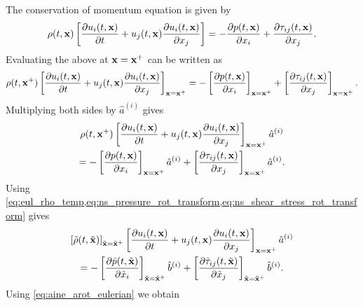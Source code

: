 \documentclass[oneside,a4paper,11pt]{report}
\begin{document}
The conservation of momentum equation is given by
\begin{equation}
    \rho(t,\mathbf{x}) \left [\frac{\partial u_i(t,\mathbf{x})}{\partial t} + u_j(t,\mathbf{x}) \frac{\partial u_i(t,\mathbf{x})}{\partial x_j} \right ] = -\frac{\partial p(t,\mathbf{x})}{\partial x_i} + \frac{\partial \tau_{ij}(t,\mathbf{x})}{\partial x_j}.
\end{equation}
Evaluating the above at $\mathbf{x} = \mathbf{x}^+$ can be written as
\begin{equation}
    \rho(t,\mathbf{x}^+) \left [\frac{\partial u_i(t,\mathbf{x})}{\partial t} + u_j(t,\mathbf{x}) \frac{\partial u_i(t,\mathbf{x})}{\partial x_j} \right ]_{\mathbf{x} = \mathbf{x}^+} = -\left [ \frac{\partial p(t,\mathbf{x})}{\partial x_i} \right]_{\mathbf{x} = \mathbf{x}^+} + \left [ \frac{\partial \tau_{ij}(t,\mathbf{x})}{\partial x_j} \right ]_{\mathbf{x} = \mathbf{x}^+}.
\end{equation}
Multiplying both sides by $\hat{a}^{(i)}$ gives
\begin{multline}
    \rho(t,\mathbf{x}^+) \left [\frac{\partial u_i(t,\mathbf{x})}{\partial t} + u_j(t,\mathbf{x}) \frac{\partial u_i(t,\mathbf{x})}{\partial x_j} \right ]_{\mathbf{x} = \mathbf{x}^+} \hat{a}^{(i)} \\
    = -\left [ \frac{\partial p(t,\mathbf{x})}{\partial x_i} \right]_{\mathbf{x} = \mathbf{x}^+} \hat{a}^{(i)} + \left [ \frac{\partial \tau_{ij}(t,\mathbf{x})}{\partial x_j} \right ]_{\mathbf{x} = \mathbf{x}^+} \hat{a}^{(i)}.
\end{multline}
Using \cref{eq:eul_rho_temp,eq:ns_pressure_rot_transform,eq:ns_shear_stress_rot_transform} gives
\begin{multline}
    \left [ \tilde{\rho}(t,\tilde{\mathbf{x}}) \right]_{\tilde{\mathbf{x}} = \tilde{\mathbf{x}}^+} \left [\frac{\partial u_i(t,\mathbf{x})}{\partial t} + u_j(t,\mathbf{x}) \frac{\partial u_i(t,\mathbf{x})}{\partial x_j} \right ]_{\mathbf{x} = \mathbf{x}^+} \hat{a}^{(i)} \\
    = -\left [ \frac{\partial \tilde{p}(t,\tilde{\mathbf{x}})}{\partial \tilde{x}_i} \right]_{\tilde{\mathbf{x}} = \tilde{\mathbf{x}}^+} \hat{b}^{(i)} + \left [ \frac{\partial \tilde{\tau}_{ij}(t,\tilde{\mathbf{x}})}{\partial \tilde{x}_j} \right ]_{\tilde{\mathbf{x}} = \tilde{\mathbf{x}}^+} \hat{b}^{(i)}.
\end{multline}
Using \cref{eq:aine_arot_eulerian} we obtain
\end{document}
